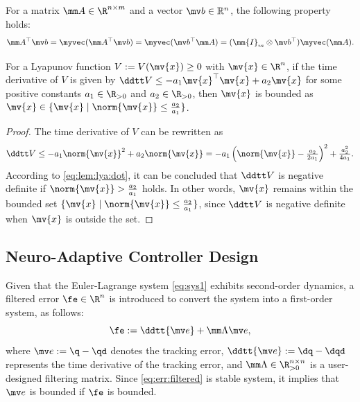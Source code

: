 \documentclass[letterpaper, journal]{IEEEtran}
\begin{document}
\begin{propsit} \label{propsit:kron}
	For a matrix $\mm A\in\R^{n\times m}$ and a vector $\mv b\in\mathbb R^n$, the following property holds:
	\begin{equation}
		\mm A^\top \mv b 
		= 
		\myvec(\mm A^\top\mv b)
		=
		\myvec(\mv b^\top\mm A)
		= 
		(\mm{I}_{m}\otimes \mv b^\top) \myvec(\mm A)
		.
	\end{equation}
\end{propsit}


\begin{lem} \label{lem:stable:set}
    For a Lyapunov function $V:=V(\mv{x})\ge0$ with $\mv{x}\in\R^n$, if the time derivative of $V$ is given by $\ddtt V\le -a_1 \mv{x}^\top \mv{x} + a_2 \mv{x}$ for some positive constants $a_1\in\R_{>0}$ and $a_2\in\R_{>0}$, then $\mv{x}$ is bounded as $\mv{x}\in\{\mv{x}\mid\norm{\mv{x}}\le\tfrac{a_2}{a_1}\}$.
\end{lem}

\begin{proof}
    The time derivative of $V$ can be rewritten as
    \begin{equation}
        \ddtt V
        \le
        -a_1 \norm{\mv{x}}^2 + a_2 \norm{\mv{x}}
        =
        -a_1
        \left(
            \norm{\mv{x}}-\tfrac{a_2}{2a_1}
        \right)^2
        +
        \tfrac{a_2^2}{4a_1}
        .
        \label{eq:lem:lya:dot}
    \end{equation}
    According to \eqref{eq:lem:lya:dot}, it can be concluded that $\ddtt V$ is negative definite if $\norm{\mv{x}}>\tfrac{a_2}{a_1}$ holds.
    In other words, $\mv{x}$ remains within the bounded set $\{\mv{x}\mid\norm{\mv{x}}\le\tfrac{a_2}{a_1}\}$, since $\ddtt V$ is negative definite when $\mv{x}$ is outside the set.
\end{proof}


\subsection{Neuro-Adaptive Controller Design}\label{sec:sub:NAC}

Given that the Euler-Lagrange system \eqref{eq:sys1} exhibits second-order dynamics, a filtered error $\fe\in\R^n$ is introduced to convert the system into a first-order system, as follows:
\begin{equation}
    \fe := \ddtt{\mv e}+\mm\Lambda \mv e
    ,
    \label{eq:err:filtered}
\end{equation}
where $\mv e := \q - \qd$ denotes the tracking error, $\ddtt{\mv e} := \dq - \dqd$ represents the time derivative of the tracking error, and $\mm\Lambda\in\R^{n\times n}_{>0}$ is a user-designed filtering matrix.
Since \eqref{eq:err:filtered} is stable system, it implies that $\mv e$ is bounded if $\fe$ is bounded.
\end{document}
